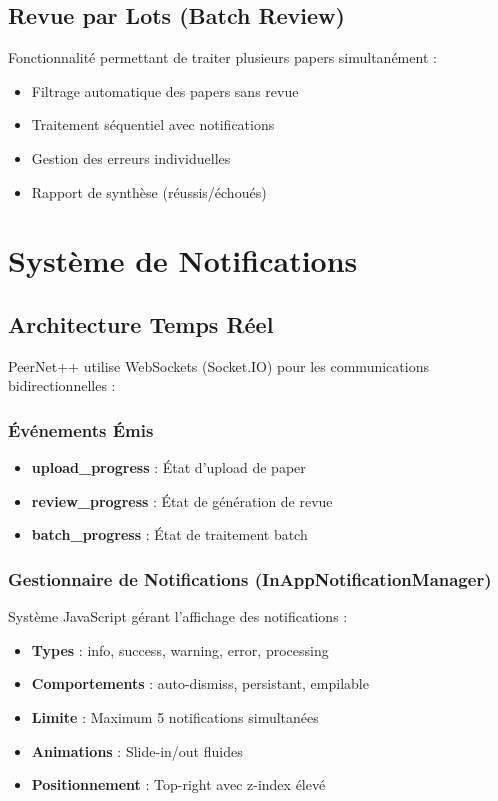 \documentclass[12pt,a4paper]{article}
\begin{document}
\subsection{Revue par Lots (Batch Review)}

Fonctionnalité permettant de traiter plusieurs papers simultanément :
\begin{itemize}
    \item Filtrage automatique des papers sans revue
    \item Traitement séquentiel avec notifications
    \item Gestion des erreurs individuelles
    \item Rapport de synthèse (réussis/échoués)
\end{itemize}

\section{Système de Notifications}

\subsection{Architecture Temps Réel}

PeerNet++ utilise WebSockets (Socket.IO) pour les communications bidirectionnelles :

\subsubsection{Événements Émis}
\begin{itemize}
    \item \textbf{upload\_progress} : État d'upload de paper
    \item \textbf{review\_progress} : État de génération de revue
    \item \textbf{batch\_progress} : État de traitement batch
\end{itemize}

\subsubsection{Gestionnaire de Notifications (InAppNotificationManager)}

Système JavaScript gérant l'affichage des notifications :
\begin{itemize}
    \item \textbf{Types} : info, success, warning, error, processing
    \item \textbf{Comportements} : auto-dismiss, persistant, empilable
    \item \textbf{Limite} : Maximum 5 notifications simultanées
    \item \textbf{Animations} : Slide-in/out fluides
    \item \textbf{Positionnement} : Top-right avec z-index élevé
\end{itemize}
\end{document}
